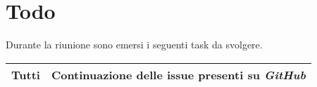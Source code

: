 \section{Todo}
Durante la riunione sono emersi i seguenti task da svolgere.

\begin{center}
  \begin{tabular}{|p{5cm}|p{7cm}|}
    \hline
    Tutti & Continuazione delle issue presenti su \textit{GitHub} \\ \hline
  \end{tabular}
\end{center}
